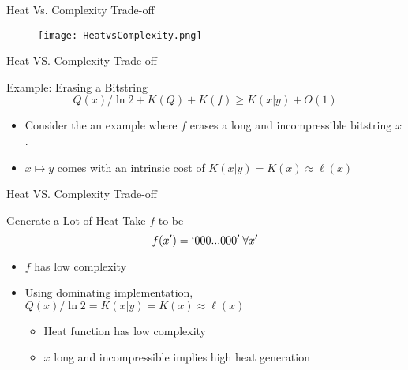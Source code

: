 \begin{frame}{Heat Vs. Complexity Trade-off}

    \begin{figure}
            \centering
            \texttt{[image: HeatvsComplexity.png]}
            \label{fig:HeatvsComplexity}
        \end{figure}
    
\end{frame}

\begin{frame}{Heat VS. Complexity Trade-off}
    \begin{block}{Example: Erasing a Bitstring}
    \begin{equation*}
        Q(x)/\ln 2 + K(Q) + K(f) \ge K(x|y) + O(1)
    \end{equation*}
    \begin{itemize}
        \item Consider the an example where $f$ erases a long and incompressible bitstring $x$.
        \item $x\mapsto y$ comes with an intrinsic cost of $K(x|y) = K(x) \approx \ell(x)$
    \end{itemize}
    \end{block}
\end{frame}

\begin{frame}{Heat VS. Complexity Trade-off}
    \begin{block}{Generate a Lot of Heat}
    Take $f$ to be
    \begin{equation*}
        f(x') = `000...000' \:\forall x'
    \end{equation*}
    \begin{itemize}
        \item $f$ has low complexity
        \item Using dominating implementation, $Q(x)/\ln 2 = K(x|y) = K(x)\approx \ell(x)$
        \begin{itemize}
            \item Heat function has low complexity
            \item $x$ long and incompressible implies high heat generation
        \end{itemize}
    \end{itemize}
    \end{block}
\end{frame}

